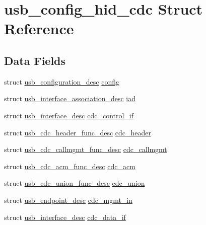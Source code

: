 \hypertarget{structusb__config__hid__cdc}{\section{usb\-\_\-config\-\_\-hid\-\_\-cdc \-Struct \-Reference}
\label{structusb__config__hid__cdc}
}
\subsection*{\-Data \-Fields}
\begin{DoxyCompactItemize}
\item 
struct \hyperlink{structusb__configuration__desc}{usb\-\_\-configuration\-\_\-desc} \hyperlink{group___p_i_o_s___u_s_b___d_e_s_c_ga41025645591a4ff38c6bfb3bf799cdf1}{config}
\item 
struct \*
\hyperlink{structusb__interface__association__desc}{usb\-\_\-interface\-\_\-association\-\_\-desc} \hyperlink{group___p_i_o_s___u_s_b___d_e_s_c_ga0dc1bab4cabd04ace89b858ba3f7b259}{iad}
\item 
struct \hyperlink{structusb__interface__desc}{usb\-\_\-interface\-\_\-desc} \hyperlink{group___p_i_o_s___u_s_b___d_e_s_c_ga9cc4f55f507f420505ac9114cf7b9df3}{cdc\-\_\-control\-\_\-if}
\item 
struct \hyperlink{structusb__cdc__header__func__desc}{usb\-\_\-cdc\-\_\-header\-\_\-func\-\_\-desc} \hyperlink{group___p_i_o_s___u_s_b___d_e_s_c_gaedeb1a14bf5f0cfea7d70e97389205c8}{cdc\-\_\-header}
\item 
struct \hyperlink{structusb__cdc__callmgmt__func__desc}{usb\-\_\-cdc\-\_\-callmgmt\-\_\-func\-\_\-desc} \hyperlink{group___p_i_o_s___u_s_b___d_e_s_c_ga1463830a390b3358935b4b39260c5762}{cdc\-\_\-callmgmt}
\item 
struct \hyperlink{structusb__cdc__acm__func__desc}{usb\-\_\-cdc\-\_\-acm\-\_\-func\-\_\-desc} \hyperlink{group___p_i_o_s___u_s_b___d_e_s_c_gafafcc283fdd68e1f1f71b102c226fc23}{cdc\-\_\-acm}
\item 
struct \hyperlink{structusb__cdc__union__func__desc}{usb\-\_\-cdc\-\_\-union\-\_\-func\-\_\-desc} \hyperlink{group___p_i_o_s___u_s_b___d_e_s_c_gafdccd743e5f58edeace549e15f512d44}{cdc\-\_\-union}
\item 
struct \hyperlink{structusb__endpoint__desc}{usb\-\_\-endpoint\-\_\-desc} \hyperlink{group___p_i_o_s___u_s_b___d_e_s_c_gae83909d6ab80cf2e1ce3ecd22d1dc9ec}{cdc\-\_\-mgmt\-\_\-in}
\item 
struct \hyperlink{structusb__interface__desc}{usb\-\_\-interface\-\_\-desc} \hyperlink{group___p_i_o_s___u_s_b___d_e_s_c_ga80b1d19d38b5379618c5e66f0da9dcb2}{cdc\-\_\-data\-\_\-if}

\end{DoxyCompactItemize}
